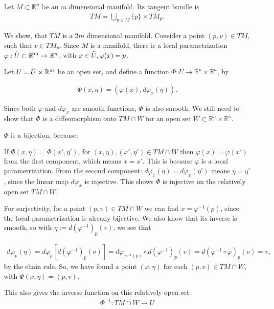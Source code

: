 \begin{solution}[9.3]
Let $M\subset \mathbb{R}^n$ be an $m$ dimensional manifold. Its tangent bundle is 
\begin{align}
TM = \bigcup_{p\in M} \{p\}\times TM_p. 
\end{align}

We show, that $TM$ is a $2m$ dimensional manifold. Consider a point $(p,v)\in TM$, such that $v\in TM_p$. Since $M$ is a manifold, there is a local parametrization $\varphi:\Tilde{U}\subset \mathbb{R}^m \to \mathbb{R}^n$, with $x\in \Tilde{U}, \varphi(x)=p$.

Let $U = \Tilde{U} \times \mathbb{R}^m$ be an open set, and define a function
$\Phi :U \to \mathbb{R}^n\times \mathbb{R}^n$, by

\begin{align}
\Phi(x, \eta) = (\varphi(x), d\varphi_x(\eta)).
\end{align}

Since both $\varphi$ and $d\varphi_x$ are smooth functions, $\Phi$ is also smooth. 
We still need to show that $\Phi$ is a diffeomorphism onto $TM\cap W$ for an open set $W\subset \mathbb{R}^n \times \mathbb{R}^n$.

$\Phi$ is a bijection, because:

If $\Phi(x,\eta) = \Phi(x', \eta')$, for $(x, \eta), (x', \eta') \in TM\cap W$ then $\varphi(x) = \varphi(x')$ from the first component, which means $x=x'$. This is because $\varphi$ is a local parametrization. From the second component: $d\varphi_x(\eta) = d\varphi_x(\eta')$ means $\eta = \eta'$, since the linear map $d\varphi_x$ is injective. This shows $\Phi$ is injective on the relatively open set $TM\cap W$. 

For surjectivity, for a point $(p, v)\in TM\cap W$ we can find $x=\varphi^{-1}(p)$, since the local parametrization is already bijective. We also know that its inverse is smooth, so with $\eta := d(\varphi^{-1})_p(v)$, we see that

\begin{align}
d\varphi_p(\eta)=d\varphi_p[d(\varphi^{-1})_p(v)] = d\varphi_{\varphi^{-1}(p)}\circ d(\varphi^{-1})_p(v) = d(\varphi^{-1}\circ \varphi)_p(v) = v,
\end{align}
by the chain rule. So, we have found a point $(x, \eta)$ for each $(p,v)\in  TM\cap W$, with $\Phi(x,\eta) = (p,v)$.

This also gives the inverse function on this relatively open set: 
\begin{align}
\Phi^{-1}: TM\cap W \to U
\end{align}


\end{solution}

